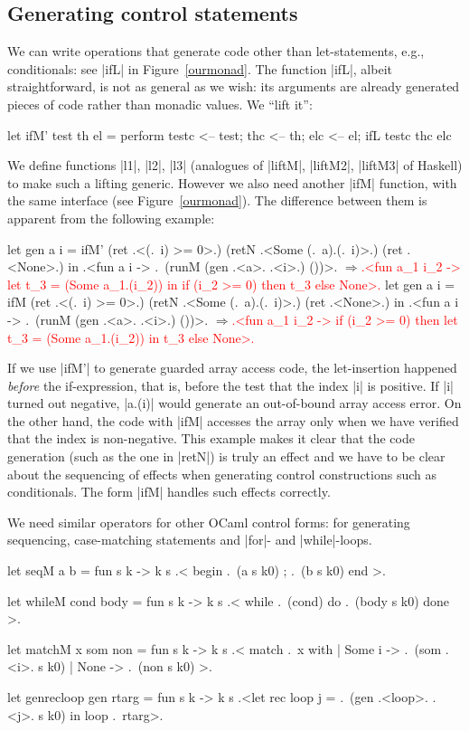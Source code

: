 \documentclass[draft]{elsart}
\newcommand{\evalresult}[1]{\ensuremath{\Longrightarrow}\textcolor{red}{#1}}
\begin{document}
\subsection{Generating control statements}
We can write operations that generate code other than let-statements,
e.g., conditionals: see |ifL| in Figure~\ref{ourmonad}. The function |ifL|, 
albeit straightforward, is not as general as we wish: its arguments are
already generated pieces of code rather than monadic values. We
``lift it'':
\begin{code}
let ifM' test th el = perform
  testc <-- test; thc <-- th; elc <-- el;
  ifL testc thc elc
\end{code}
We define functions |l1|,
|l2|, |l3| (analogues of |liftM|, |liftM2|, |liftM3| of Haskell) 
to make such a lifting generic. However we also need
another |ifM| function, with the same
interface (see Figure~\ref{ourmonad}).
The difference between them is
apparent from the following example:
\begin{code}
let gen a i = ifM' (ret .<(.~i) >= 0>.) 
                   (retN .<Some (.~a).(.~i)>.) (ret .<None>.)
 in .<fun a i -> .~(runM (gen .<a>. .<i>.) ())>.
\evalresult{.<fun a_1 i_2 ->}
\textcolor{red}{      let t_3 = (Some a_1.(i_2)) in if (i_2 >= 0) then t_3 else None>.}
let gen a i = ifM (ret .<(.~i) >= 0>.) 
                  (retN .<Some (.~a).(.~i)>.) (ret .<None>.)
 in .<fun a i -> .~(runM (gen .<a>. .<i>.) ())>.
\evalresult{.<fun a_1 i_2 ->}
\textcolor{red}{      if (i_2 >= 0) then let t_3 = (Some a_1.(i_2)) in t_3 else None>.}
\end{code}
%
If we use |ifM'| to generate guarded array access code, the let-insertion
happened \emph{before} the if-expression, that is, before the test that
the index |i| is positive. If |i| turned out
negative, |a.(i)| would generate an out-of-bound array access
error. On the other hand, the code with |ifM| accesses the array only
when we have verified that the index is non-negative. This example
makes it clear that the code generation (such as the one in |retN|) is 
truly an effect and we have to be clear about the sequencing of
effects when generating control constructions such as conditionals.
The form |ifM| handles such effects correctly. 

We need similar operators for other OCaml control forms: for
generating sequencing, case-matching statements and |for|- and |while|-loops.
\begin{code}
let seqM a b = fun s k -> 
  k s .< begin .~(a s k0) ; .~(b s k0) end >.

let whileM cond body = fun s k -> 
  k s .< while .~(cond) do .~(body s k0) done >.

let matchM x som non = fun s k -> k s .< match .~x with
           | Some i -> .~(som .<i>. s k0)
           | None   -> .~(non s k0) >.

let genrecloop gen rtarg = fun s k -> 
  k s .<let rec loop j = .~(gen .<loop>. .<j>. s k0) in loop .~rtarg>.
\end{code}
\end{document}
